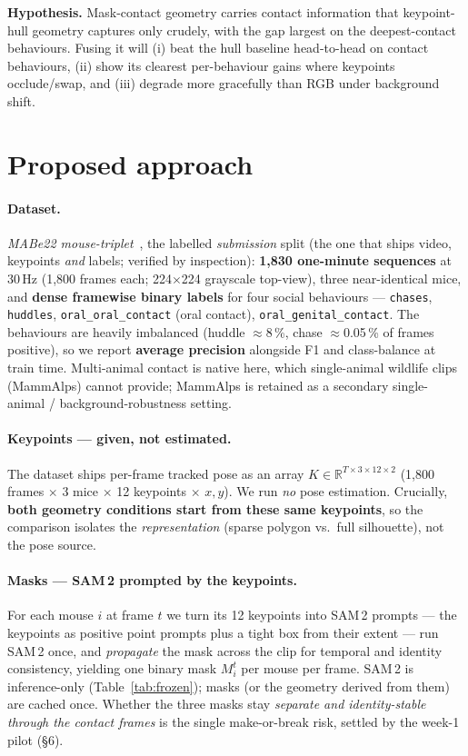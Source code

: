 \documentclass[11pt]{article}
\begin{document}
\noindent\textbf{Hypothesis.} Mask-contact geometry carries contact information that
keypoint-hull geometry captures only crudely, with the gap largest on the deepest-contact
behaviours. Fusing it will (i) beat the hull baseline head-to-head on contact behaviours, (ii)
show its clearest per-behaviour gains where keypoints occlude/swap, and (iii) degrade more
gracefully than RGB under background shift.

\section{Proposed approach}
\paragraph{Dataset.} \emph{MABe22 mouse-triplet}~\cite{mabe22}, the labelled \emph{submission}
split (the one that ships video, keypoints \emph{and} labels; verified by inspection):
\textbf{1{,}830 one-minute sequences} at 30\,Hz (1{,}800 frames each; 224$\times$224 grayscale
top-view), three near-identical mice, and \textbf{dense framewise binary labels} for four social
behaviours — \texttt{chases}, \texttt{huddles}, \texttt{oral\_oral\_contact} (oral contact),
\texttt{oral\_genital\_contact}. The behaviours are heavily imbalanced (huddle $\approx$8\,\%,
chase $\approx$0.05\,\% of frames positive), so we report \textbf{average precision} alongside F1
and class-balance at train time. Multi-animal contact is native here, which single-animal wildlife
clips (MammAlps) cannot provide; MammAlps is retained as a secondary single-animal /
background-robustness setting.

\paragraph{Keypoints — given, not estimated.} The dataset ships per-frame tracked pose as an array
$K \in \mathbb{R}^{T\times 3 \times 12 \times 2}$ (1{,}800 frames $\times$ 3 mice $\times$ 12
keypoints $\times$ $x,y$). We run \emph{no} pose estimation. Crucially, \textbf{both geometry
conditions start from these same keypoints}, so the comparison isolates the \emph{representation}
(sparse polygon vs.\ full silhouette), not the pose source.

\paragraph{Masks — SAM\,2 prompted by the keypoints.} For each mouse $i$ at frame $t$ we turn its
12 keypoints into SAM\,2 prompts — the keypoints as positive point prompts plus a tight box from
their extent — run SAM\,2 once, and \emph{propagate} the mask across the clip for temporal and
identity consistency, yielding one binary mask $M_i^t$ per mouse per frame. SAM\,2 is inference-only
(Table~\ref{tab:frozen}); masks (or the geometry derived from them) are cached once. Whether the
three masks stay \emph{separate and identity-stable through the contact frames} is the single
make-or-break risk, settled by the week-1 pilot (\S6).
\end{document}
